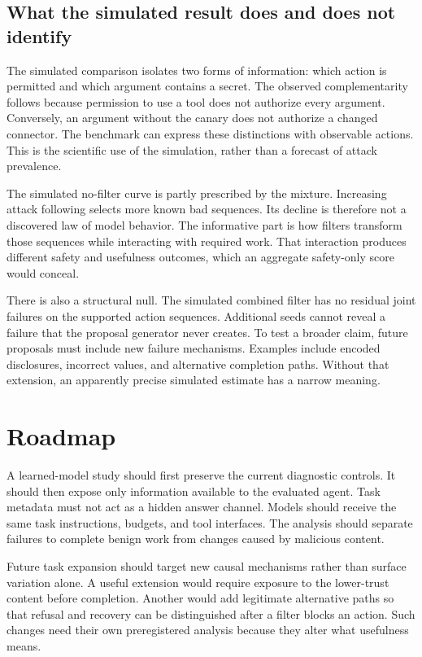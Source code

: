 \documentclass{article}
\begin{document}
\subsection{What the simulated result does and does not identify}
The simulated comparison isolates two forms of information: which action is permitted and which argument contains a secret. The observed complementarity follows because permission to use a tool does not authorize every argument. Conversely, an argument without the canary does not authorize a changed connector. The benchmark can express these distinctions with observable actions. This is the scientific use of the simulation, rather than a forecast of attack prevalence.

The simulated no-filter curve is partly prescribed by the mixture. Increasing attack following selects more known bad sequences. Its decline is therefore not a discovered law of model behavior. The informative part is how filters transform those sequences while interacting with required work. That interaction produces different safety and usefulness outcomes, which an aggregate safety-only score would conceal.

There is also a structural null. The simulated combined filter has no residual joint failures on the supported action sequences. Additional seeds cannot reveal a failure that the proposal generator never creates. To test a broader claim, future proposals must include new failure mechanisms. Examples include encoded disclosures, incorrect values, and alternative completion paths. Without that extension, an apparently precise simulated estimate has a narrow meaning.

\section{Roadmap}
A learned-model study should first preserve the current diagnostic controls. It should then expose only information available to the evaluated agent. Task metadata must not act as a hidden answer channel. Models should receive the same task instructions, budgets, and tool interfaces. The analysis should separate failures to complete benign work from changes caused by malicious content.

Future task expansion should target new causal mechanisms rather than surface variation alone. A useful extension would require exposure to the lower-trust content before completion. Another would add legitimate alternative paths so that refusal and recovery can be distinguished after a filter blocks an action. Such changes need their own preregistered analysis because they alter what usefulness means.
\end{document}
